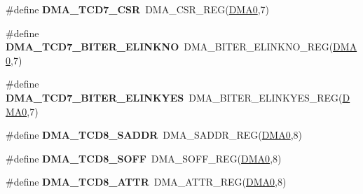 \begin{DoxyCompactItemize}
\item 
\#define {\bfseries D\+M\+A\+\_\+\+T\+C\+D7\+\_\+\+C\+SR}~D\+M\+A\+\_\+\+C\+S\+R\+\_\+\+R\+EG(\hyperlink{group__DMA__Peripheral__Access__Layer_ga4103044f9ca209772f513dc694513ffb}{D\+M\+A0},7)\hypertarget{group__DMA__Register__Accessor__Macros_ga3e5e4f7009e022d05759c2c0fe27f647}{}\label{group__DMA__Register__Accessor__Macros_ga3e5e4f7009e022d05759c2c0fe27f647}

\item 
\#define {\bfseries D\+M\+A\+\_\+\+T\+C\+D7\+\_\+\+B\+I\+T\+E\+R\+\_\+\+E\+L\+I\+N\+K\+NO}~D\+M\+A\+\_\+\+B\+I\+T\+E\+R\+\_\+\+E\+L\+I\+N\+K\+N\+O\+\_\+\+R\+EG(\hyperlink{group__DMA__Peripheral__Access__Layer_ga4103044f9ca209772f513dc694513ffb}{D\+M\+A0},7)\hypertarget{group__DMA__Register__Accessor__Macros_ga52ee5bb622bffc9bb99342293afbd4ba}{}\label{group__DMA__Register__Accessor__Macros_ga52ee5bb622bffc9bb99342293afbd4ba}

\item 
\#define {\bfseries D\+M\+A\+\_\+\+T\+C\+D7\+\_\+\+B\+I\+T\+E\+R\+\_\+\+E\+L\+I\+N\+K\+Y\+ES}~D\+M\+A\+\_\+\+B\+I\+T\+E\+R\+\_\+\+E\+L\+I\+N\+K\+Y\+E\+S\+\_\+\+R\+EG(\hyperlink{group__DMA__Peripheral__Access__Layer_ga4103044f9ca209772f513dc694513ffb}{D\+M\+A0},7)\hypertarget{group__DMA__Register__Accessor__Macros_ga93ea45ae3f261c96d302fc05caf8c74f}{}\label{group__DMA__Register__Accessor__Macros_ga93ea45ae3f261c96d302fc05caf8c74f}

\item 
\#define {\bfseries D\+M\+A\+\_\+\+T\+C\+D8\+\_\+\+S\+A\+D\+DR}~D\+M\+A\+\_\+\+S\+A\+D\+D\+R\+\_\+\+R\+EG(\hyperlink{group__DMA__Peripheral__Access__Layer_ga4103044f9ca209772f513dc694513ffb}{D\+M\+A0},8)\hypertarget{group__DMA__Register__Accessor__Macros_ga20929e81a1414d68284332fe54c3394e}{}\label{group__DMA__Register__Accessor__Macros_ga20929e81a1414d68284332fe54c3394e}

\item 
\#define {\bfseries D\+M\+A\+\_\+\+T\+C\+D8\+\_\+\+S\+O\+FF}~D\+M\+A\+\_\+\+S\+O\+F\+F\+\_\+\+R\+EG(\hyperlink{group__DMA__Peripheral__Access__Layer_ga4103044f9ca209772f513dc694513ffb}{D\+M\+A0},8)\hypertarget{group__DMA__Register__Accessor__Macros_gab1105a5f653de713708697e108fa31fd}{}\label{group__DMA__Register__Accessor__Macros_gab1105a5f653de713708697e108fa31fd}

\item 
\#define {\bfseries D\+M\+A\+\_\+\+T\+C\+D8\+\_\+\+A\+T\+TR}~D\+M\+A\+\_\+\+A\+T\+T\+R\+\_\+\+R\+EG(\hyperlink{group__DMA__Peripheral__Access__Layer_ga4103044f9ca209772f513dc694513ffb}{D\+M\+A0},8)\hypertarget{group__DMA__Register__Accessor__Macros_ga13699886fa956fad85a58d6e9caa8692}{}\label{group__DMA__Register__Accessor__Macros_ga13699886fa956fad85a58d6e9caa8692}


\end{DoxyCompactItemize}
